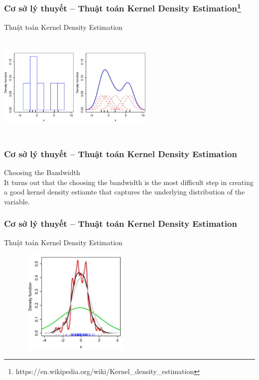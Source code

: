 \documentclass[t]{beamer}
\begin{document}

\begin{frame}
\frametitle{Cơ sở lý thuyết -- Thuật toán Kernel Density Estimation\footnote{https://en.wikipedia.org/wiki/Kernel\_density\_estimation}}
Thuật toán Kernel Density Estimation
\begin{center}
\includegraphics[height=2in,width=3in]{500px-Comparison_of_1D_histogram_and_KDE.png}
\end{center}
\end{frame}


\begin{frame}
\frametitle{Cơ sở lý thuyết -- Thuật toán Kernel Density Estimation}
Choosing the Bandwidth\\
It turns out that the choosing the bandwidth is the most difficult step in creating a good kernel density estiamte that captures the underlying distribution of the variable.\\
\end{frame}


\begin{frame}
\frametitle{Cơ sở lý thuyết -- Thuật toán Kernel Density Estimation}
Thuật toán Kernel Density Estimation
\begin{center}
\includegraphics[height=2in,width=3in]{220px-Comparison_of_1D_bandwidth_selectors.png}
\end{center}
\end{frame}
\end{document}
